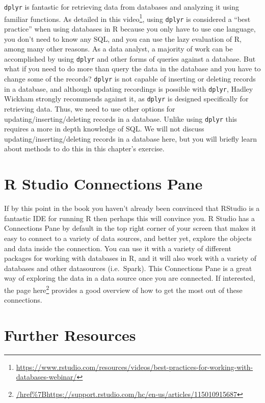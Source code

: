 \documentclass[]{krantz}
\renewcommand{\href}[2]{#2\footnote{\url{#1}}}
\begin{document}
\texttt{dplyr} is fantastic for retrieving data from databases and
analyzing it using familiar functions. As detailed in this
\href{https://www.rstudio.com/resources/videos/best-practices-for-working-with-databases-webinar/}{video},
using \texttt{dplyr} is considered a ``best practice'' when using
databases in R because you only have to use one language, you don't need
to know any SQL, and you can use the lazy evaluation of R, among many
other reasons. As a data analyst, a majority of work can be accomplished
by using \texttt{dplyr} and other forms of queries against a database.
But what if you need to do more than query the data in the database and
you have to change some of the records? \texttt{dplyr} is not capable of
inserting or deleting records in a database, and although updating
recordings is possible with \texttt{dplyr}, Hadley Wickham strongly
recommends against it, as \texttt{dplyr} is designed specifically for
retrieving data. Thus, we need to use other options for
updating/inserting/deleting records in a database. Unlike using
\texttt{dplyr} this requires a more in depth knowledge of SQL. We will
not discuss updating/inserting/deleting records in a database here, but
you will briefly learn about methods to do this in this chapter's
exercise.

\section{R Studio Connections Pane}\label{r-studio-connections-pane}

If by this point in the book you haven't already been convinced that
RStudio is a fantastic IDE for running R then perhaps this will convince
you. R Studio has a Connections Pane by default in the top right corner
of your screen that makes it easy to connect to a variety of data
sources, and better yet, explore the objects and data inside the
connection. You can use it with a variety of different packages for
working with databases in R, and it will also work with a variety of
databases and other datasources (i.e.~Spark). This Connections Pane is a
great way of exploring the data in a data source once you are connected.
If interested, the page
\href{/href\%7Bhttps://support.rstudio.com/hc/en-us/articles/115010915687}{here}
provides a good overview of how to get the most out of these
connections.

\section{Further Resources}\label{further-resources}
\end{document}
